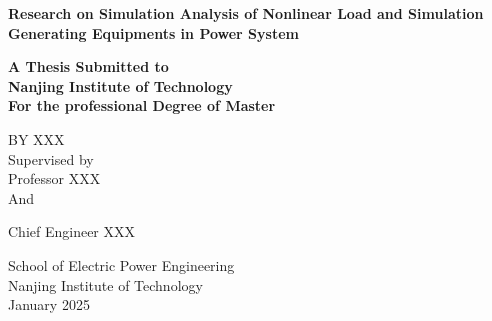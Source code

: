\newpage
\thispagestyle{empty}

\begin{center}
    \vspace*{1cm}
    
    {\songti {} \textbf{Research on Simulation Analysis of Nonlinear Load and Simulation Generating Equipments in Power System}}
    
    \vspace{2cm}
    
    { \textbf{A Thesis Submitted to}} \\
    \vspace{0.5cm}
    { \textbf{Nanjing Institute of Technology}} \\
    \vspace{0.5cm}
    { \textbf{For the professional Degree of Master}}
    
    \vspace{2.5cm}
    
    { BY XXX} \\
    \vspace{1.5cm}
    { Supervised by } \\
    \vspace{0.3cm}
     { Professor XXX} \\
    \vspace{0.3cm}
    { And}
    
    \vspace{0.3cm} { Chief Engineer XXX}
    
    \vspace{3cm}
    
    { School of Electric Power Engineering} \\
    \vspace{0.3cm}
    { Nanjing Institute of Technology} \\
    \vspace{0.3cm}
    { January 2025}
    
\end{center}
\newpage

